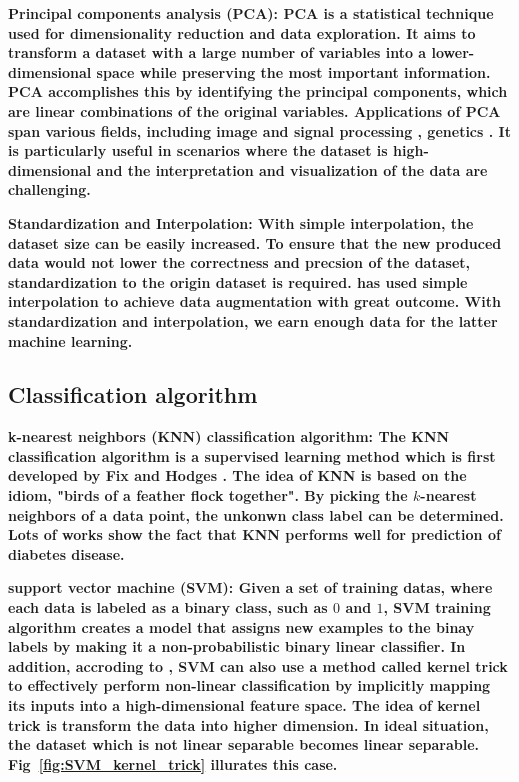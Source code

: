 \documentclass[twocolumn,10pt]{article}
\begin{document}
\bf{Principal components analysis (PCA)}: \rm{PCA} is a statistical technique used for dimensionality 
reduction and data exploration. It aims to transform a dataset with a large number of variables into 
a lower-dimensional space while preserving the most important information. PCA accomplishes this by 
identifying the principal components, which are linear combinations of the original variables. 
Applications of PCA span various fields, including image \cite{ma2019dimension} \cite{YANG20021997} 
and signal processing \cite{6497960} \cite{castells2007principal}, genetics \cite{reich2008principal} 
\cite{novembre2008interpreting}. It is particularly useful in scenarios where the dataset is 
high-dimensional and the interpretation and visualization of the data are challenging.

\bf{Standardization and Interpolation}: \rm{With} simple interpolation, the dataset size can be easily increased. To ensure that the new produced data would not lower the correctness and precsion of the dataset, standardization to the origin dataset is required.\cite{chen2022doublemix} has used simple interpolation to achieve data augmentation with great outcome. With standardization and interpolation, we earn enough data for the latter machine learning.

\subsection*{Classification algorithm}

\bf{k-nearest neighbors (KNN) classification algorithm}: \rm{The} KNN classification algorithm is a 
supervised learning method which is first developed by Fix and Hodges \cite{10.2307/1403797}. The idea 
of KNN is based on the idiom, "birds of a feather flock together". By picking the $k$-nearest neighbors 
of a data point, the unkonwn class label can be determined. Lots of works \cite{6528591} \cite{8276012} 
\cite{vijayan2014study} show the fact that KNN performs  well for prediction of diabetes disease.

\bf{support vector machine (SVM)}: \rm{Given} a set of training datas, where each data is labeled as a 
binary class, such as $0$ and $1$, SVM training algorithm creates a model that assigns new examples to 
the binay labels by making it a non-probabilistic binary linear classifier. In addition, accroding to 
\cite{amari1999improving} \cite{hofmann2006support}, SVM can also use a method called kernel trick to 
effectively perform non-linear classification by implicitly mapping its inputs into a high-dimensional 
feature space. 
The idea of kernel trick is transform the data into higher dimension. In ideal situation, the dataset 
which is not linear separable becomes linear separable. Fig~\ref{fig:SVM_kernel_trick} illurates this 
case. 
\end{document}

